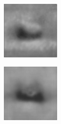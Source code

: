 \begin{figure}[H]
\begin{subfigure}[t]{0.13\textwidth}
  \end{subfigure}
  \begin{subfigure}[t]{0.13\textwidth}
    \centering
    \includegraphics[width=\linewidth]{img/one-trial/prediction_3_mse.png}
  \end{subfigure}
  \begin{subfigure}[t]{0.13\textwidth}
    \centering
    \includegraphics[width=\linewidth]{img/one-trial/prediction_3_ssim.png}

\end{subfigure}
\end{figure}
